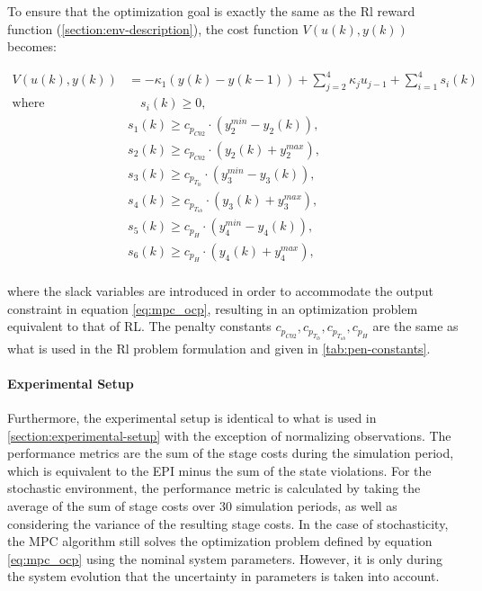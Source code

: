 To ensure that the optimization goal is exactly the same as the Rl reward function (\autoref{section:env-description}), the cost function $V(u(k),y(k))$ becomes:

\begin{equation} \label{eq:mpc_cost_function}
	\begin{aligned}
		V(u(k),y(k)) & = - \kappa_1 (y(k) - y(k-1)) + \sum_{j=2}^4 {\kappa_j u_{j-1}} + \sum_{i = 1}^4 s_i(k) \\
		\text{where} & \quad s_i(k) \geq 0, \\
		& s_1(k) \geq c_{p_{C02}} \cdot (y_2^{min} - y_2(k)), \\ 
		& s_2(k) \geq c_{p_{C02}} \cdot (y_2(k) + y_2^{max}), \\ 
		& s_3(k) \geq c_{p_{T_{lb}}} \cdot (y_3^{min} - y_3(k)), \\ 
		& s_4(k) \geq c_{p_{T_{ub}}} \cdot (y_3(k) + y_3^{max}), \\ 
		& s_5(k) \geq c_{p_{H}} \cdot (y_4^{min} - y_4(k)), \\ 
		& s_6(k) \geq c_{p_{H}} \cdot (y_4(k) + y_4^{max}), \\
	\end{aligned}	
\end{equation}

where the slack variables are introduced in order to accommodate the output constraint in equation \autoref{eq:mpc_ocp}, resulting in an optimization problem equivalent to that of RL. The penalty constants $c_{p_{C02}},c_{p_{T_{lb}}},c_{p_{T_{ub}}},c_{p_{H}}$ are the same as what is used in the Rl problem formulation and given in \autoref{tab:pen-constants}.

\paragraph{Experimental Setup} Furthermore, the experimental setup is identical to what is used in \autoref{section:experimental-setup} with the exception of normalizing observations. The performance metrics are the sum of the stage costs during the simulation period, which is equivalent to the EPI minus the sum of the state violations. For the stochastic environment, the performance metric is calculated by taking the average of the sum of stage costs over 30 simulation periods, as well as considering the variance of the resulting stage costs. In the case of stochasticity, the MPC algorithm still solves the optimization problem defined by equation \autoref{eq:mpc_ocp} using the nominal system parameters. However, it is only during the system evolution that the uncertainty in parameters is taken into account.


